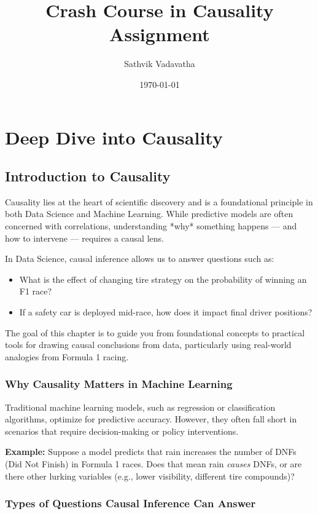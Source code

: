 \documentclass[12pt]{book}
\title{Crash Course in Causality Assignment}
\author{Sathvik Vadavatha}
\date{\today}
\begin{document}
\maketitle


\chapter{Deep Dive into Causality}

\section{Introduction to Causality}

Causality lies at the heart of scientific discovery and is a foundational principle in both Data Science and Machine Learning. While predictive models are often concerned with correlations, understanding *why* something happens — and how to intervene — requires a causal lens.

In Data Science, causal inference allows us to answer questions such as:
\begin{itemize}
    \item What is the effect of changing tire strategy on the probability of winning an F1 race?
    \item If a safety car is deployed mid-race, how does it impact final driver positions?
\end{itemize}

The goal of this chapter is to guide you from foundational concepts to practical tools for drawing causal conclusions from data, particularly using real-world analogies from Formula 1 racing.

\subsection*{Why Causality Matters in Machine Learning}

Traditional machine learning models, such as regression or classification algorithms, optimize for predictive accuracy. However, they often fall short in scenarios that require decision-making or policy interventions.

\textbf{Example:} Suppose a model predicts that rain increases the number of DNFs (Did Not Finish) in Formula 1 races. Does that mean rain \textit{causes} DNFs, or are there other lurking variables (e.g., lower visibility, different tire compounds)?

\subsection*{Types of Questions Causal Inference Can Answer}
\end{document}
